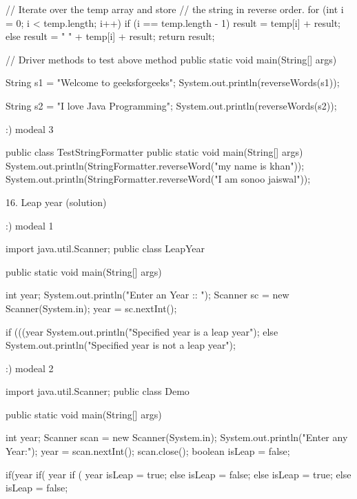 {{{        // Iterate over the temp array and store
        // the string in reverse order.
        for (int i = 0; i < temp.length; i++) {
            if (i == temp.length - 1)
                result = temp[i] + result;
            else
                result = " " + temp[i] + result;
        }
        return result;
    }
  
    // Driver methods to test above method
    public static void main(String[] args)
    {
        String s1 = "Welcome to geeksforgeeks";
        System.out.println(reverseWords(s1));
  
        String s2 = "I love Java Programming";
        System.out.println(reverseWords(s2));
    }
}

 
 :) modeal 3
 
  public class TestStringFormatter {  
  public static void main(String[] args) {  
    System.out.println(StringFormatter.reverseWord("my name is khan"));  
    System.out.println(StringFormatter.reverseWord("I am sonoo jaiswal"));    
    }  
   }  
   
   

16. Leap year (solution)

:) modeal 1

			import java.util.Scanner;
public class LeapYear {
   public static void main(String[] args){
      int year;
      System.out.println("Enter an Year :: ");
      Scanner sc = new Scanner(System.in);
      year = sc.nextInt();

      if (((year %
         System.out.println("Specified year is a leap year");
      else
         System.out.println("Specified year is not a leap year");
   }
}


:) modeal 2

		import java.util.Scanner;
public class Demo {

    public static void main(String[] args) {

    	int year;
    	Scanner scan = new Scanner(System.in);
    	System.out.println("Enter any Year:");
    	year = scan.nextInt();
    	scan.close();
        boolean isLeap = false;

        if(year %
        {
            if( year %
            {
                if ( year %
                    isLeap = true;
                else
                    isLeap = false;
            }
            else
                isLeap = true;
        }
        else {
            isLeap = false;
        }

}}}
